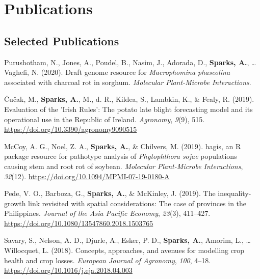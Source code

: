 \documentclass[11pt, a4paper]{awesome-cv}
\begin{document}
\hypertarget{publications}{%
\section{Publications}\label{publications}}

\hypertarget{selected-publications}{%
\subsection{Selected Publications}\label{selected-publications}}

\begingroup
\setlength{\parindent}{-0.5in}
\setlength{\leftskip}{0.5in}

\hypertarget{refs_articles}{}
\leavevmode\hypertarget{ref-Purushotham2020}{}%
Purushotham, N., Jones, A., Poudel, B., Nasim, J., Adorada, D., \textbf{Sparks, A.}, \ldots{} Vaghefi, N. (2020). Draft genome resource for \emph{Macrophomina phaseolina} associated with charcoal rot in sorghum. \emph{Molecular Plant-Microbe Interactions}.

\leavevmode\hypertarget{ref-cucak2019evaluation}{}%
Čučak, M., \textbf{Sparks, A.}, M., d. R., Kildea, S., Lambkin, K., \& Fealy, R. (2019). Evaluation of the 'Irish Rules': The potato late blight forecasting model and its operational use in the Republic of Ireland. \emph{Agronomy}, \emph{9}(9), 515. \url{https://doi.org/10.3390/agronomy9090515}

\leavevmode\hypertarget{ref-mccoy2019hagis}{}%
McCoy, A. G., Noel, Z. A., \textbf{Sparks, A.}, \& Chilvers, M. (2019). hagis, an R package resource for pathotype analysis of \emph{Phytophthora sojae} populations causing stem and root rot of soybean. \emph{Molecular Plant-Microbe Interactions}, \emph{32}(12). \url{https://doi.org/10.1094/MPMI-07-19-0180-A}

\leavevmode\hypertarget{ref-doi:10.1080ux2f13547860.2018.1503765}{}%
Pede, V. O., Barboza, G., \textbf{Sparks, A.}, \& McKinley, J. (2019). The inequality-growth link revisited with spatial considerations: The case of provinces in the Philippines. \emph{Journal of the Asia Pacific Economy}, \emph{23}(3), 411--427. \url{https://doi.org/10.1080/13547860.2018.1503765}

\leavevmode\hypertarget{ref-Savary2018}{}%
Savary, S., Nelson, A. D., Djurle, A., Esker, P. D., \textbf{Sparks, A.}, Amorim, L., \ldots{} Willocquet, L. (2018). Concepts, approaches, and avenues for modelling crop health and crop losses. \emph{European Journal of Agronomy}, \emph{100}, 4--18. \url{https://doi.org/10.1016/j.eja.2018.04.003}
\end{document}
